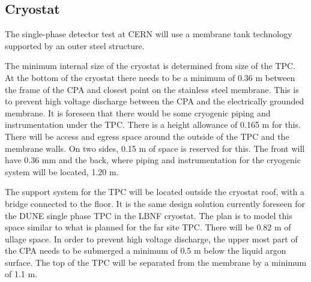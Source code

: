 \label{cryo}
\subsection{Cryostat}



The single-phase detector test at CERN will use a membrane tank technology supported by an outer steel structure.

The minimum internal size of the cryostat is determined from size of the TPC.  At the bottom of the 
cryostat there needs to be a minimum of 0.36 m between the frame of the CPA and closest point on the stainless steel 
membrane.  This is to prevent high voltage discharge between the CPA and the electrically grounded 
membrane. It is foreseen that there would be some cryogenic piping and instrumentation under the TPC.  
There is a height allowance of 0.165 m for this.  There will be access and egress space around the outside 
of the TPC and the membrane walls.  On two sides, 0.15 m of space is reserved for this. The front will have 0.36 mm and the back, where piping and instrumentation for the cryogenic system will be located, 1.20 m.

The support system for the TPC will be located outside the cryostat roof, with a bridge connected to the floor. 
It is the same design solution currently foreseen for the DUNE single phase TPC in the LBNF cryostat.  
The plan is to model this space similar to what is planned for the far site TPC.  There 
will be 0.82 m of ullage space.  In order to prevent high voltage discharge, the upper most part of the CPA 
needs to be submerged a minimum of 0.5 m below the liquid argon surface.  The top of the TPC will be 
separated from the membrane by a minimum of 1.1 m.  


